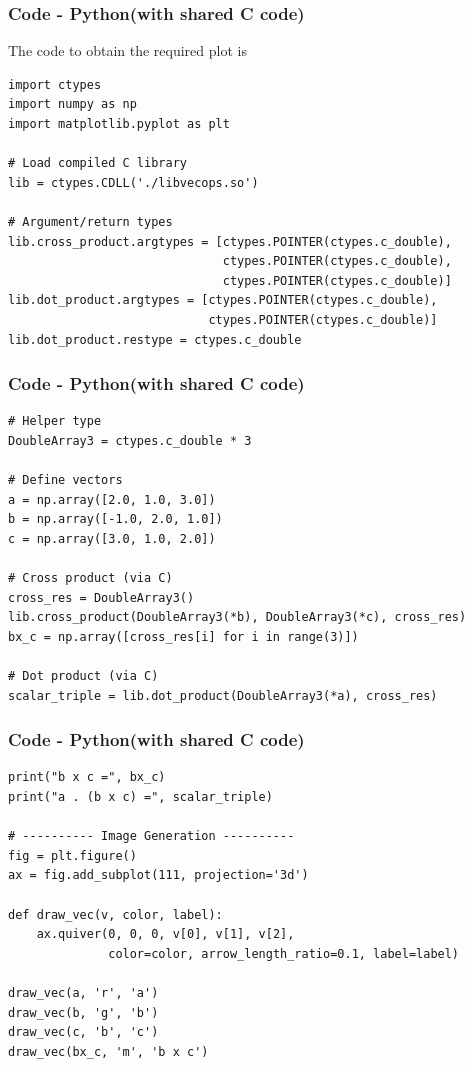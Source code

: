 \documentclass{beamer}
\theoremstyle{remark}
\numberwithin{equation}{section}
\begin{document}
\begin{frame}[fragile]
    \frametitle{Code - Python(with shared C code)}
    The code to obtain the required plot is
    \begin{lstlisting}
import ctypes
import numpy as np
import matplotlib.pyplot as plt

# Load compiled C library
lib = ctypes.CDLL('./libvecops.so')

# Argument/return types
lib.cross_product.argtypes = [ctypes.POINTER(ctypes.c_double),
                              ctypes.POINTER(ctypes.c_double),
                              ctypes.POINTER(ctypes.c_double)]
lib.dot_product.argtypes = [ctypes.POINTER(ctypes.c_double),
                            ctypes.POINTER(ctypes.c_double)]
lib.dot_product.restype = ctypes.c_double

\end{lstlisting}
\end{frame}
\begin{frame}[fragile]
\frametitle{Code - Python(with shared C code)}
\begin{lstlisting}
# Helper type
DoubleArray3 = ctypes.c_double * 3

# Define vectors
a = np.array([2.0, 1.0, 3.0])
b = np.array([-1.0, 2.0, 1.0])
c = np.array([3.0, 1.0, 2.0])

# Cross product (via C)
cross_res = DoubleArray3()
lib.cross_product(DoubleArray3(*b), DoubleArray3(*c), cross_res)
bx_c = np.array([cross_res[i] for i in range(3)])

# Dot product (via C)
scalar_triple = lib.dot_product(DoubleArray3(*a), cross_res)

\end{lstlisting}
\end{frame}

\begin{frame}[fragile]
\frametitle{Code - Python(with shared C code)}
\begin{lstlisting}
print("b x c =", bx_c)
print("a . (b x c) =", scalar_triple)

# ---------- Image Generation ----------
fig = plt.figure()
ax = fig.add_subplot(111, projection='3d')

def draw_vec(v, color, label):
    ax.quiver(0, 0, 0, v[0], v[1], v[2],
              color=color, arrow_length_ratio=0.1, label=label)

draw_vec(a, 'r', 'a')
draw_vec(b, 'g', 'b')
draw_vec(c, 'b', 'c')
draw_vec(bx_c, 'm', 'b x c')

\end{lstlisting}
\end{frame}
\end{document}
